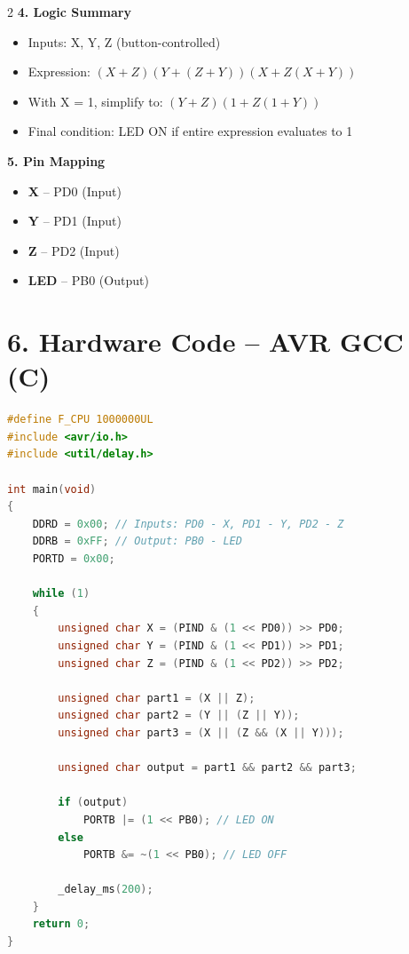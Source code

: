 \documentclass[12pt]{article}
\begin{document}
\begin{multicols}{2}
\vspace{1em}
\noindent\textbf{4. Logic Summary}
\begin{itemize}
    \item Inputs: X, Y, Z (button-controlled)
    \item Expression: \( (X + Z)(Y + (Z + Y))(X + Z(X + Y)) \)
    \item With X = 1, simplify to: \( (Y + Z)(1 + Z(1 + Y)) \)
    \item Final condition: LED ON if entire expression evaluates to 1
\end{itemize}

\vspace{1em}
\noindent\textbf{5. Pin Mapping}
\begin{itemize}
    \item \textbf{X} – PD0 (Input)
    \item \textbf{Y} – PD1 (Input)
    \item \textbf{Z} – PD2 (Input)
    \item \textbf{LED} – PB0 (Output)
\end{itemize}

\end{multicols}

\newpage
\section*{6. Hardware Code – AVR GCC (C)}
\begin{lstlisting}[language=C]
#define F_CPU 1000000UL
#include <avr/io.h>
#include <util/delay.h>

int main(void)
{
    DDRD = 0x00; // Inputs: PD0 - X, PD1 - Y, PD2 - Z
    DDRB = 0xFF; // Output: PB0 - LED
    PORTD = 0x00;

    while (1)
    {
        unsigned char X = (PIND & (1 << PD0)) >> PD0;
        unsigned char Y = (PIND & (1 << PD1)) >> PD1;
        unsigned char Z = (PIND & (1 << PD2)) >> PD2;

        unsigned char part1 = (X || Z);
        unsigned char part2 = (Y || (Z || Y));
        unsigned char part3 = (X || (Z && (X || Y)));

        unsigned char output = part1 && part2 && part3;

        if (output)
            PORTB |= (1 << PB0); // LED ON
        else
            PORTB &= ~(1 << PB0); // LED OFF

        _delay_ms(200);
    }
    return 0;
}
\end{lstlisting}
\end{document}
